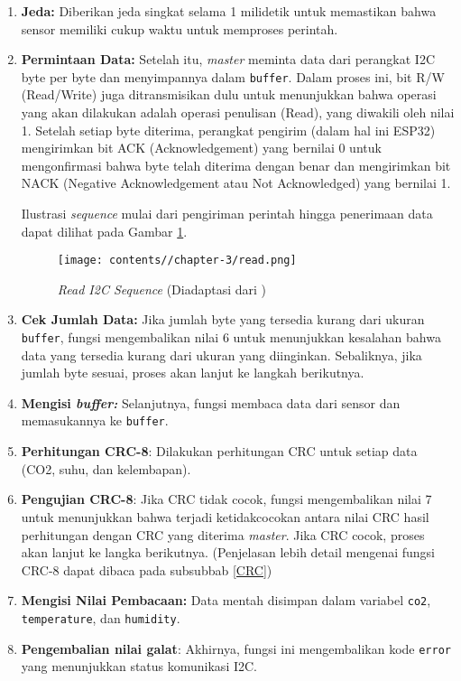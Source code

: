 \begin{enumerate}
            \item \textbf{Jeda:} Diberikan jeda singkat selama 1 milidetik untuk memastikan bahwa sensor memiliki cukup waktu untuk memproses perintah.
            
            \item \textbf{Permintaan Data:} Setelah itu, \textit{master} meminta data dari perangkat I2C byte per byte dan menyimpannya dalam \texttt{buffer}. Dalam proses ini, bit R/W (Read/Write) juga ditransmisikan dulu untuk menunjukkan bahwa operasi yang akan dilakukan adalah operasi penulisan (Read), yang diwakili oleh nilai 1. Setelah setiap byte diterima, perangkat pengirim (dalam hal ini ESP32) mengirimkan bit ACK (Acknowledgement) yang bernilai 0 untuk mengonfirmasi bahwa byte telah diterima dengan benar dan mengirimkan bit NACK (Negative Acknowledgement atau Not Acknowledged) yang bernilai 1. 

            Ilustrasi \textit{sequence} mulai dari pengiriman perintah hingga penerimaan data dapat dilihat pada Gambar \ref{fig:read}.

            \begin{figure}[H]
                \centering
                \texttt{[image: contents//chapter-3/read.png]}
                \caption{\textit{Read I2C Sequence} (Diadaptasi dari \cite{scd4x_datasheet})}
                \label{fig:read}
            \end{figure}
            
            \item \textbf{Cek Jumlah Data:} Jika jumlah byte yang tersedia kurang dari ukuran \texttt{buffer}, fungsi mengembalikan nilai 6 untuk menunjukkan kesalahan bahwa data yang tersedia kurang dari ukuran yang diinginkan. Sebaliknya, jika jumlah byte sesuai, proses akan lanjut ke langkah berikutnya.
            
            \item \textbf{Mengisi \textit{buffer:}} Selanjutnya, fungsi membaca data dari sensor dan memasukannya ke \texttt{buffer}.
            
            \item \textbf{Perhitungan CRC-8}: Dilakukan perhitungan CRC untuk setiap data (CO2, suhu, dan kelembapan).
            
            \item \textbf{Pengujian CRC-8}: Jika CRC tidak cocok, fungsi mengembalikan nilai 7 untuk menunjukkan bahwa terjadi ketidakcocokan antara nilai CRC hasil perhitungan dengan CRC yang diterima \textit{master}. Jika CRC cocok, proses akan lanjut ke langka berikutnya. (Penjelasan lebih detail mengenai fungsi CRC-8 dapat dibaca pada subsubbab \ref{CRC})
            
            \item \textbf{Mengisi Nilai Pembacaan:} Data mentah disimpan dalam variabel \texttt{co2}, \texttt{temperature}, dan \texttt{humidity}.

            \item \textbf{Pengembalian nilai galat}: Akhirnya, fungsi ini mengembalikan kode \texttt{error} yang menunjukkan status komunikasi I2C.
        \end{enumerate}
            
